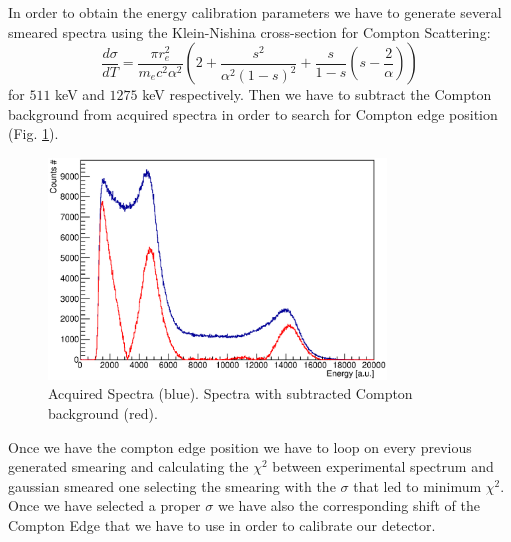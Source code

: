 \documentclass[a4paper,11pt]{article}
\begin{document}
\noindent In order to obtain the energy calibration parameters we have to generate several smeared spectra using the Klein-Nishina cross-section for Compton Scattering:
\begin{equation*}
\dfrac{d\sigma}{dT} = \dfrac{\pi r_e^2}{m_ec^2\alpha^2}\left(2+\dfrac{s^2}{\alpha^2(1-s)^2}+\dfrac{s}{1-s} \left(s-\dfrac{2}{\alpha}\right) \right)
\end{equation*}
for $511$ keV and $1275$ keV respectively. Then we have to subtract the Compton background from acquired spectra in order to search for Compton edge position (Fig. \ref{fig: compton back}).
\begin{figure}[h!]
\centering
\includegraphics[width=0.8\textwidth]{spectra_vs_background.eps}
\caption{Acquired Spectra (blue). Spectra with subtracted Compton background (red).}
\label{fig: compton back}
\end{figure}

\noindent Once we have the compton edge position we have to loop on every previous generated smearing and calculating the $\chi^2$ between experimental spectrum and gaussian smeared one selecting the smearing with the $\sigma$ that led to minimum $\chi^2$. Once we have selected a proper $\sigma$ we have also the corresponding shift of the Compton Edge that we have to use in order to calibrate our detector.
\end{document}
